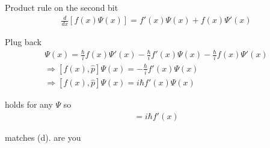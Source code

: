 \documentclass[
]{article}
\providecommand{\Rarr}{\Rightarrow}
\begin{document}
Product rule on the second bit
\begin{gather*}
	\tfrac{d}{dx}[f(x)\Psi(x)]=f'(x)\Psi(x)+f(x)\Psi'(x)
\end{gather*}

Plug back
\begin{gather*}
	[f(x),\hat{p}]\Psi(x)=\tfrac{\hbar}{i}f(x)\Psi'(x)-\tfrac{\hbar}{i}f'(x)\Psi(x)-\tfrac{\hbar}{i}f(x)\Psi'(x)\\
	\Rarr [f(x),\hat{p}]\Psi(x)=-\tfrac{\hbar}{i}f'(x)\Psi(x)\\
	\Rarr [f(x),\hat{p}]\Psi(x)=i\hbar f'(x)\Psi(x)
\end{gather*}

holds for any \(\Psi\) so
\begin{gather*}
	[f(x),\hat{p}]=i\hbar f'(x)
\end{gather*}

matches (d).
are you
\end{document}
